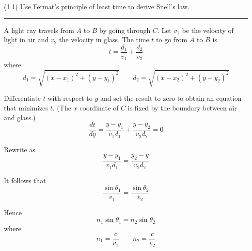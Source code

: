 \documentclass[12pt]{article}
\begin{document}
(1.1)
Use Fermat's principle of least time to derive Snell's law.

\bigskip
\hrule

\begin{center}
\end{center}

A light ray travels from $A$ to $B$ by going through $C$.
Let $v_1$ be the velocity of light in air and $v_2$ the velocity in glass.
The time $t$ to go from $A$ to $B$ is
\begin{equation*}
t=\frac{d_1}{v_1}+\frac{d_2}{v_2}
\end{equation*}
where
\begin{equation*}
d_1=\sqrt{(x-x_1)^2+(y-y_1)^2}\qquad
d_2=\sqrt{(x-x_2)^2+(y-y_2)^2}
\end{equation*}

Differentiate $t$ with respect to $y$ and set the result to zero to obtain an equation that minimizes $t$.
(The $x$ coordinate of $C$ is fixed by the boundary between air and glass.)
\begin{equation*}
\frac{dt}{dy}=\frac{y-y_1}{v_1d_1}+\frac{y-y_2}{v_2d_2}=0
\end{equation*}

Rewrite as
\begin{equation*}
\frac{y-y_1}{v_1d_1}=\frac{y_2-y}{v_2d_2}
\end{equation*}

It follows that
\begin{equation*}
\frac{\sin\theta_1}{v_1}=\frac{\sin\theta_2}{v_2}
\end{equation*}

Hence
\begin{equation*}
n_1\sin\theta_1=n_2\sin\theta_2
\end{equation*}
where
\begin{equation*}
n_1=\frac{c}{v_1}\qquad n_2=\frac{c}{v_2}
\end{equation*}
\end{document}
